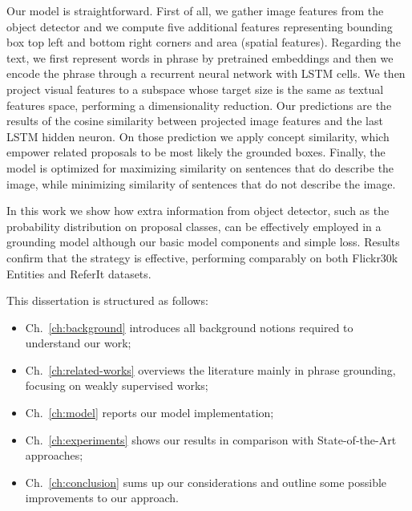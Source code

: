 Our model is straightforward. First of all, we gather image features
from the object detector and we compute five additional features
representing bounding box top left and bottom right corners and area
(spatial features). Regarding the text, we first represent words in
phrase by pretrained embeddings and then we encode the phrase through
a recurrent neural network with LSTM cells. We then project visual
features to a subspace whose target size is the same as textual
features space, performing a dimensionality reduction. Our predictions
are the results of the cosine similarity between projected image
features and the last LSTM hidden neuron. On those prediction we apply
concept similarity, which empower related proposals to be most likely
the grounded boxes. Finally, the model is optimized for maximizing
similarity on sentences that do describe the image, while minimizing
similarity of sentences that do not describe the image.

In this work we show how extra information from object detector, such
as the probability distribution on proposal classes, can be
effectively employed in a grounding model although our basic model
components and simple loss. Results confirm that the strategy is
effective, performing comparably on both Flickr30k Entities and
ReferIt datasets.

This dissertation is structured as follows:
\begin{itemize}
    \item Ch.~\ref{ch:background} introduces all background notions
    required to understand our work;
    \item Ch.~\ref{ch:related-works} overviews the literature mainly
    in phrase grounding, focusing on weakly supervised works;
    \item Ch.~\ref{ch:model} reports our model implementation;
    \item Ch.~\ref{ch:experiments} shows our results in comparison
    with State-of-the-Art approaches; 
    \item Ch.~\ref{ch:conclusion} sums up our considerations and
    outline some possible improvements to our approach.
\end{itemize}
